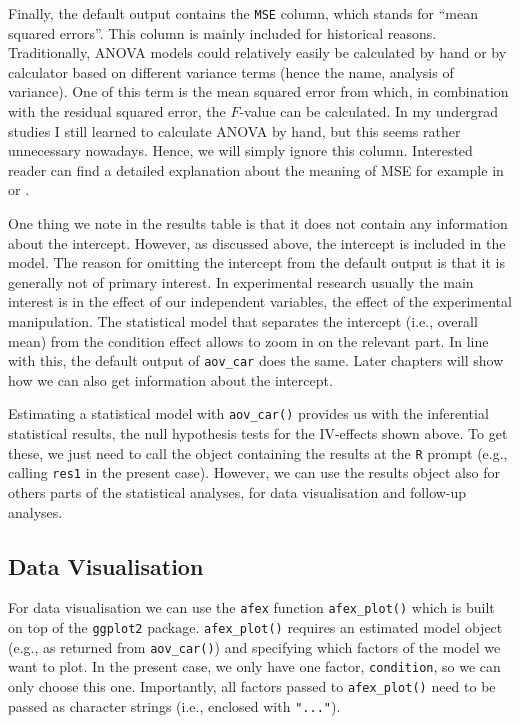 \documentclass[
]{book}
\begin{document}
Finally, the default output contains the \texttt{MSE} column, which stands for ``mean squared errors''. This column is mainly included for historical reasons. Traditionally, ANOVA models could relatively easily be calculated by hand or by calculator based on different variance terms (hence the name, analysis of variance). One of this term is the mean squared error from which, in combination with the residual squared error, the \(F\)-value can be calculated. In my undergrad studies I still learned to calculate ANOVA by hand, but this seems rather unnecessary nowadays. Hence, we will simply ignore this column. Interested reader can find a detailed explanation about the meaning of MSE for example in \citet{howellStatisticalMethodsPsychology2013} or \citet{baguleySeriousStatsGuide2012}.

One thing we note in the results table is that it does not contain any information about the intercept. However, as discussed above, the intercept is included in the model. The reason for omitting the intercept from the default output is that it is generally not of primary interest. In experimental research usually the main interest is in the effect of our independent variables, the effect of the experimental manipulation. The statistical model that separates the intercept (i.e., overall mean) from the condition effect allows to zoom in on the relevant part. In line with this, the default output of \texttt{aov\_car} does the same. Later chapters will show how we can also get information about the intercept.

Estimating a statistical model with \texttt{aov\_car()} provides us with the inferential statistical results, the null hypothesis tests for the IV-effects shown above. To get these, we just need to call the object containing the results at the \texttt{R} prompt (e.g., calling \texttt{res1} in the present case). However, we can use the results object also for others parts of the statistical analyses, for data visualisation and follow-up analyses.

\hypertarget{data-visualisation}{%
\subsection{Data Visualisation}\label{data-visualisation}}

For data visualisation we can use the \texttt{afex} function \texttt{afex\_plot()} which is built on top of the \texttt{ggplot2} package. \texttt{afex\_plot()} requires an estimated model object (e.g., as returned from \texttt{aov\_car()}) and specifying which factors of the model we want to plot. In the present case, we only have one factor, \texttt{condition}, so we can only choose this one. Importantly, all factors passed to \texttt{afex\_plot()} need to be passed as character strings (i.e., enclosed with \texttt{"..."}).
\end{document}
